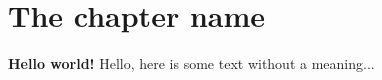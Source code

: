 \documentclass[../main.tex]{subfiles}
\begin{document}
    \section{The chapter name}
    \textbf{Hello world!}
    Hello, here is some text without a meaning...
\end{document}
